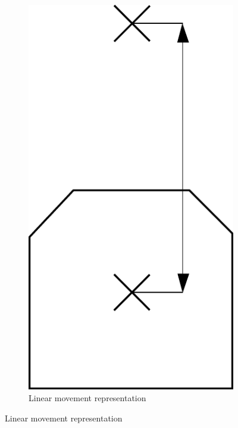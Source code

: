    \begin{figure}
        \centering
        \begin{subfigure}[b]{0.25\textwidth}
            \includegraphics[width=\textwidth]{figs/mr_relative_linear}
            \caption{Linear movement representation}
            \label{fig:mr_relative_linear}
        \end{subfigure}

\end{figure}
